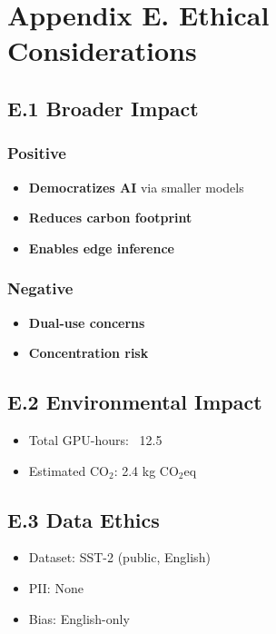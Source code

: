 \section{Appendix E. Ethical Considerations}

\subsection{E.1 Broader Impact}

\subsubsection{Positive}
\begin{itemize}
\item \textbf{Democratizes AI} via smaller models
\item \textbf{Reduces carbon footprint}
\item \textbf{Enables edge inference}

\end{itemize}
\subsubsection{Negative}
\begin{itemize}
\item \textbf{Dual-use concerns}
\item \textbf{Concentration risk}

\end{itemize}
\subsection{E.2 Environmental Impact}

\begin{itemize}
\item Total GPU-hours: ~12.5
\item Estimated CO$_2$: 2.4 kg CO$_2$eq

\end{itemize}
\subsection{E.3 Data Ethics}

\begin{itemize}
\item Dataset: SST-2 (public, English)
\item PII: None
\item Bias: English-only

\end{itemize}

